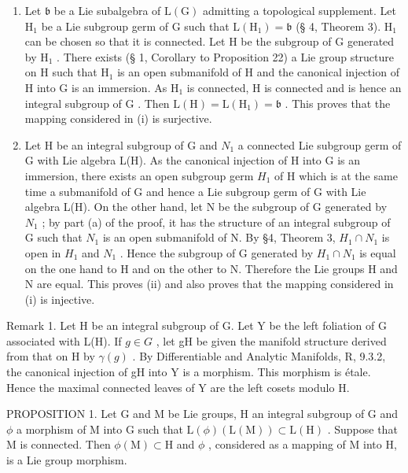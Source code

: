 \begin{enumerate}
\def\labelenumi{(\alph{enumi})}
\item
  Let \(\mathfrak{b}\) be a Lie subalgebra of \(\mathrm{L}(\mathrm{G})\) admitting a topological supplement. Let \(\mathrm{H}_{1}\) be a Lie subgroup germ of \(\mathrm{G}\) such that \(\mathrm{L}(\mathrm{H}_{1}) = \mathfrak{b}\) (§ 4, Theorem 3). \(\mathrm{H}_{1}\) can be chosen so that it is connected. Let \(\mathrm{H}\) be the subgroup of \(\mathrm{G}\) generated by \(\mathrm{H}_{1}\) . There exists (§ 1, Corollary to Proposition 22) a Lie group structure on \(\mathrm{H}\) such that \(\mathrm{H}_{1}\) is an open submanifold of \(\mathrm{H}\) and the canonical injection of \(\mathrm{H}\) into \(\mathrm{G}\) is an immersion. As \(\mathrm{H}_{1}\) is connected, \(\mathrm{H}\) is connected and is hence an integral subgroup of \(\mathrm{G}\) . Then \(\mathrm{L}(\mathrm{H}) = \mathrm{L}(\mathrm{H}_{1}) = \mathfrak{b}\) . This proves that the mapping considered in (i) is surjective.
\item
  Let H be an integral subgroup of G and \(N_{1}\) a connected Lie subgroup germ of G with Lie algebra L(H). As the canonical injection of H into G is an immersion, there exists an open subgroup germ \(H_{1}\) of H which is at the same time a submanifold of G and hence a Lie subgroup germ of G with Lie algebra L(H). On the other hand, let N be the subgroup of G generated by \(N_{1}\) ; by part (a) of the proof, it has the structure of an integral subgroup of G such that \(N_{1}\) is an open submanifold of N. By §4, Theorem 3, \(H_{1} \cap N_{1}\) is open in \(H_{1}\) and \(N_{1}\) . Hence the subgroup of G generated by \(H_{1} \cap N_{1}\) is equal on the one hand to H and on the other to N. Therefore the Lie groups H and N are equal. This proves (ii) and also proves that the mapping considered in (i) is injective.
\end{enumerate}

Remark 1. Let H be an integral subgroup of G. Let Y be the left foliation of G associated with L(H). If \(g \in G\) , let gH be given the manifold structure derived from that on H by \(\gamma(g)\) . By Differentiable and Analytic Manifolds, R, 9.3.2, the canonical injection of gH into Y is a morphism. This morphism is étale. Hence the maximal connected leaves of Y are the left cosets modulo H.

PROPOSITION 1. Let G and M be Lie groups, H an integral subgroup of G and \(\phi\) a morphism of M into G such that \(\mathrm{L}(\phi)(\mathrm{L}(\mathrm{M})) \subset \mathrm{L}(\mathrm{H})\) . Suppose that M is connected. Then \(\phi(\mathrm{M}) \subset \mathrm{H}\) and \(\phi\) , considered as a mapping of M into H, is a Lie group morphism.

